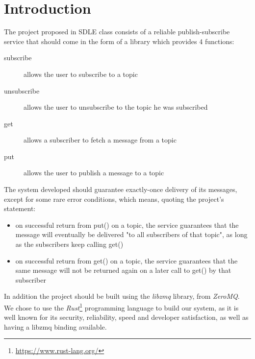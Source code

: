 \section{Introduction}
\label{sec:Introduction}

The project proposed in SDLE class consists of a reliable publish-subscribe service that should come in the form of a library which provides 4 functions:

\begin{description}
    \item[subscribe] allows the user to subscribe to a topic
    \item[unsubscribe] allows the user to unsubscribe to the topic he was subscribed
    \item[get] allows a subscriber to fetch a message from a topic
    \item[put] allows the user to publish a message to a topic
\end{description}

The system developed should guarantee exactly-once delivery of its messages, except for some rare error conditions, which means, quoting the project's statement:

\begin{itemize}
    \item on successful return from put() on a topic, the service guarantees that the message will eventually be delivered "to all subscribers of that topic", as long as the subscribers keep calling get()
    \item on successful return from get() on a topic, the service guarantees that the same message will not be returned again on a later call to get() by that subscriber
\end{itemize}

In addition the project should be built using the \emph{libzmq} library, from \emph{ZeroMQ}. We chose to use the \emph{Rust}\footnote{\url{https://www.rust-lang.org/}} programming language to build our system, as it is well known for its security, reliability, speed and developer satisfaction, as well as having a libzmq binding available.


